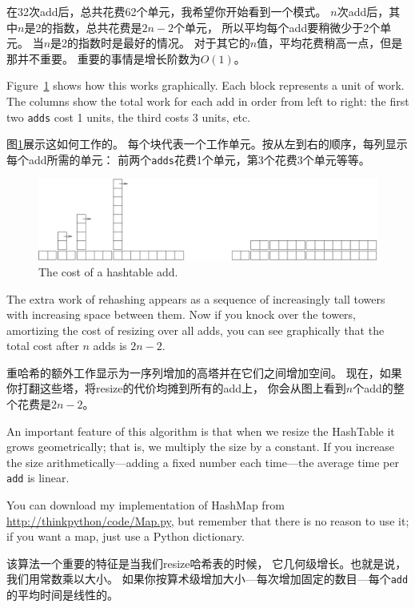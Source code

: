 \documentclass[10pt]{book}
\begin{document}
\begin{CJK}{UTF8}{gbsn}
在32次add后，总共花费62个单元，我希望你开始看到一个模式。
$n$次add后，其中$n$是2的指数，总共花费是$2n-2$个单元，
所以平均每个add要稍微少于2个单元。
当$n$是2的指数时是最好的情况。
对于其它的$n$值，平均花费稍高一点，但是那并不重要。
重要的事情是增长阶数为$O(1)$。

Figure~\ref{fig.hash} shows how this works graphically.  Each
block represents a unit of work.  The columns show the total
work for each add in order from left to right: the first two
{\tt adds} cost 1 units, the third costs 3 units, etc.

图\ref{fig.hash}展示这如何工作的。
每个块代表一个工作单元。按从左到右的顺序，每列显示每个add所需的单元：
前两个{\tt adds}花费1个单元，第3个花费3个单元等等。

\begin{figure}
\centerline{\includegraphics[scale=1.0]{figs/towers.pdf}}
\caption{The cost of a hashtable add.\label{fig.hash}}
\end{figure}

The extra work of rehashing appears as a sequence of increasingly
tall towers with increasing space between them.  Now if you knock
over the towers, amortizing the cost of resizing over all
adds, you can see graphically that the total cost after $n$
adds is $2n - 2$.

重哈希的额外工作显示为一序列增加的高塔并在它们之间增加空间。
现在，如果你打翻这些塔，将resize的代价均摊到所有的add上，
你会从图上看到$n$个add的整个花费是$2n - 2$。

An important feature of this algorithm is that when we resize the
HashTable it grows geometrically; that is, we multiply the size by a
constant.  If you increase the size
arithmetically---adding a fixed number each time---the average time
per {\tt add} is linear.

You can download my implementation of HashMap from
\url{http://thinkpython/code/Map.py}, but remember that there
is no reason to use it; if you want a map, just use a Python dictionary.

该算法一个重要的特征是当我们resize哈希表的时候，
它几何级增长。也就是说，我们用常数乘以大小。
如果你按算术级增加大小---每次增加固定的数目---每个{\tt add}的平均时间是线性的。


\end{CJK}
\end{document}
